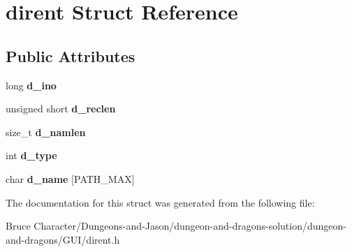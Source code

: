 \hypertarget{structdirent}{}\section{dirent Struct Reference}
\label{structdirent}
\subsection*{Public Attributes}
\begin{DoxyCompactItemize}
\item 
\hypertarget{structdirent_acb6fecfb0e0f6fdc226dff8d56c3da4a}{}\label{structdirent_acb6fecfb0e0f6fdc226dff8d56c3da4a} 
long {\bfseries d\+\_\+ino}
\item 
\hypertarget{structdirent_a90dc47836e8ef510437317876368859e}{}\label{structdirent_a90dc47836e8ef510437317876368859e} 
unsigned short {\bfseries d\+\_\+reclen}
\item 
\hypertarget{structdirent_a09ced068b03cdb339e34840c8b709621}{}\label{structdirent_a09ced068b03cdb339e34840c8b709621} 
size\+\_\+t {\bfseries d\+\_\+namlen}
\item 
\hypertarget{structdirent_ad6a736cb04c7295e8f97f708324b3500}{}\label{structdirent_ad6a736cb04c7295e8f97f708324b3500} 
int {\bfseries d\+\_\+type}
\item 
\hypertarget{structdirent_a6c68ac080755453ec52de202e91de59b}{}\label{structdirent_a6c68ac080755453ec52de202e91de59b} 
char {\bfseries d\+\_\+name} \mbox{[}P\+A\+T\+H\+\_\+\+M\+AX\mbox{]}
\end{DoxyCompactItemize}


The documentation for this struct was generated from the following file\+:\begin{DoxyCompactItemize}
\item 
Bruce Character/\+Dungeons-\/and-\/\+Jason/dungeon-\/and-\/dragons-\/solution/dungeon-\/and-\/dragons/\+G\+U\+I/dirent.\+h\end{DoxyCompactItemize}
